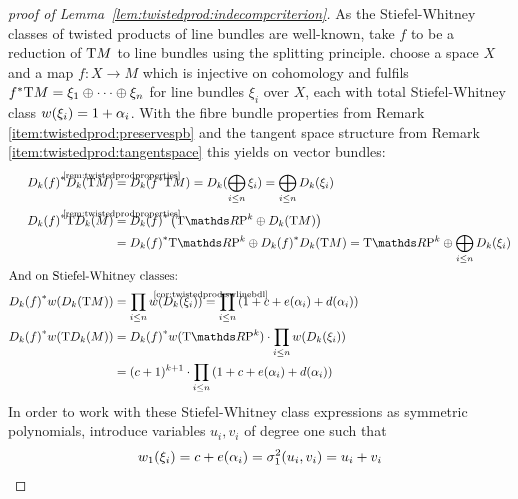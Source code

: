 \begin{proof}[proof of Lemma~\ref{lem:twistedprod:indecompcriterion}]
  As the Stiefel-Whitney classes of twisted products of line bundles
  are well-known, take $f$ to be a reduction of $\mathrm{T}M$ to line bundles
  using the splitting principle.
  \Idest choose a space $X$ and a map $f\colon X\to M$ which is
  injective on cohomology and fulfils
  ${f}^* \mathrm{T}M = \xi_1\oplus\dotsb\oplus\xi_n$ for line bundles
  $\xi_i$ over $X$, each with total Stiefel-Whitney class
  ${w}(\xi_i)=1+\alpha_i$.
  With the fibre bundle properties from
  Remark~%
  \ref{item:twistedprod:preservespb}
  and the tangent space structure from
  Remark~%
  \ref{item:twistedprod:tangentspace}
  this yields on vector bundles:
  \begin{align*}
    \pb{\Twistedprod{k}{f}} \Twistedprod{k}{\T M}
    &\cequalsby{\ref{rem:twistedprodproperties}}
      \Twistedprod{k}{\pb f \T M}
      = \Twistedprod{k}{\bigoplus_{i\leq n}\xi_i}
      = \bigoplus_{i\leq n}\Twistedprod{k}{\xi_i}
    \\
    \pb{\Twistedprod{k}{f}} \T{\Twistedprod{k}{M}}
    &\cequalsby{\ref{rem:twistedprodproperties}}
      \pb{\Twistedprod{k}{f}} \left(
      \T{\RP k} \oplus \Twistedprod{k}{\T M}
      \right)\\
    &= \pb{\Twistedprod{k}{f}} \T{\RP k}
      \oplus
      \pb{\Twistedprod{k}{f}} \Twistedprod{k}{\T M}
      = \T{\RP k} \oplus \bigoplus_{i\leq n}\Twistedprod{k}{\xi_i}\\
    \intertext{And on Stiefel-Whitney classes:}
    \pb{\Twistedprod{k}{f}} \W{\Twistedprod{k}{\T M}}
    &= \prod_{i\leq n} \W{\Twistedprod{k}{\xi_i}}
      \cequalsby{\ref{cor:twistedprod:swlinebdl}}
      \prod_{i\leq n} \left(1 + c + e(\alpha_i) + d(\alpha_i)\right)
    \\
    \pb{\Twistedprod{k}{f}} \W{\T\Twistedprod{k}{M}}
    &= \pb{\Twistedprod{k}{f}}\W{\T{\RP k}}
      \cdot \prod_{i\leq n} \W{\Twistedprod{k}{\xi_i}} \\
    &= (c+1)^{k+1}
      \cdot \prod_{i\leq n} \left(1+c+e(\alpha_i)+d(\alpha_i)\right)
  \end{align*}
  In order to work with these Stiefel-Whitney class expressions as
  symmetric polynomials, introduce variables $u_i, v_i$ of degree
  one such that
  \begin{align*}
    \w1{\xi_i} &= c+e(\alpha_i) = \el 1 2(u_i, v_i) = u_i+v_i \\

\end{align*}
\end{proof}
